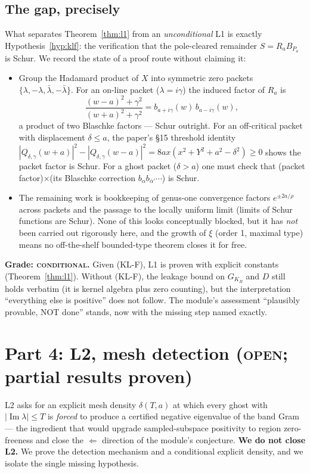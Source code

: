 \documentclass[11pt]{article}
\theoremstyle{definition}
\theoremstyle{remark}
\newcommand{\im}{\operatorname{Im}}
\begin{document}
\subsection{The gap, precisely}\label{sec:l1-gap}

What separates Theorem~\ref{thm:l1} from an \emph{unconditional} L1 is
exactly Hypothesis~\ref{hyp:klf}: the verification that the pole-cleared
remainder $S=R_aB_{P_a}$ is Schur. We record the state of a proof route
without claiming it:
\begin{itemize}
\item Group the Hadamard product of $X$ into symmetric zero packets
$\{\lambda,-\lambda,\bar\lambda,-\bar\lambda\}$. For an on-line packet
($\lambda=i\gamma$) the induced factor of $R_a$ is
\[
\frac{(w-a)^2+\gamma^2}{(w+a)^2+\gamma^2}
=b_{a+i\gamma}(w)\,b_{a-i\gamma}(w),
\]
a product of two Blaschke factors --- Schur outright. For an off-critical
packet with displacement $\delta\le a$, the paper's \S15 threshold identity
$|Q_{\delta,\gamma}(w+a)|^2-|Q_{\delta,\gamma}(w-a)|^2
=8ax(x^2+Y^2+a^2-\delta^2)\ge0$ shows the packet factor is Schur. For a
ghost packet ($\delta>a$) one must check that (packet factor)$\times$(its
Blaschke correction $b_{\alpha}b_{\bar\alpha'}\cdots$) is Schur.
\item The remaining work is bookkeeping of genus-one convergence factors
$e^{\pm2a/\rho}$ across packets and the passage to the locally uniform limit
(limits of Schur functions are Schur). None of this looks conceptually
blocked, but it has \emph{not} been carried out rigorously here, and the
growth of $\xi$ (order 1, maximal type) means no off-the-shelf
bounded-type theorem closes it for free.
\end{itemize}
\textbf{Grade: \textsc{conditional}.} Given (KL-F), L1 is proven with
explicit constants (Theorem~\ref{thm:l1}). Without (KL-F), the leakage bound
on $G_{K_B}$ and $D$ still holds verbatim (it is kernel algebra plus zero
counting), but the interpretation ``everything else is positive'' does not
follow. The module's assessment ``plausibly provable, NOT done'' stands, now
with the missing step named exactly.

\section{Part 4: L2, mesh detection (\textsc{open}; partial results proven)}
\label{sec:l2}

L2 asks for an explicit mesh density $\delta(T,a)$ at which every ghost with
$|\im\lambda|\le T$ is \emph{forced} to produce a certified negative
eigenvalue of the band Gram --- the ingredient that would upgrade
sampled-subspace positivity to region zero-freeness and close the
$\Leftarrow$ direction of the module's conjecture. \textbf{We do not close
L2.} We prove the detection mechanism and a conditional explicit density,
and we isolate the single missing hypothesis.
\end{document}
